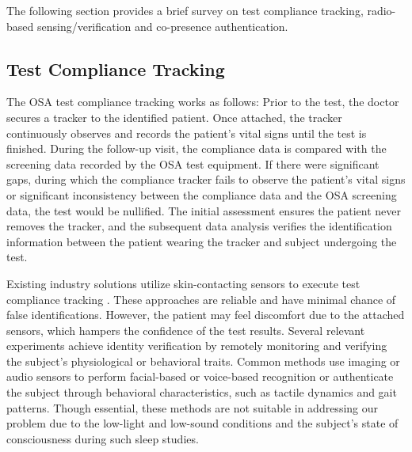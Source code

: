 The following section provides a brief survey on test compliance tracking, radio-based sensing/verification and co-presence authentication.

\subsection{Test Compliance Tracking}

The OSA test compliance tracking works as follows: Prior to the test, the doctor secures a tracker to the identified patient. Once attached, the tracker continuously observes and records the patient's vital signs until the test is finished. During the follow-up visit, the compliance data is compared with the screening data recorded by the OSA test equipment. If there were significant gaps, during which the compliance tracker fails to observe the patient's vital signs or significant inconsistency between the compliance data and the OSA screening data, the test would be nullified. The initial assessment ensures the patient never removes the tracker, and the subsequent data analysis verifies the identification information between the patient wearing the tracker and subject undergoing the test. 

Existing industry solutions utilize skin-contacting sensors to execute test compliance tracking \cite{noauthor_httpspatentsgooglecompatentus8679012b1en_nodate, noauthor_httpwwwsleepreviewmagcom201806tech-fraudulent-sleep-data_nodate}. These approaches are reliable and have minimal chance of false identifications. However, the patient may feel discomfort due to the attached sensors, which hampers the confidence of the test results. Several relevant experiments achieve identity verification by remotely monitoring and verifying the subject's physiological or behavioral traits. Common methods use imaging or audio sensors to perform facial-based or voice-based recognition \cite{hutchison_robust_2005, li_sound-based_2010,abushariah_voice_2012} or  authenticate the subject through behavioral characteristics, such as tactile dynamics and gait patterns\cite{collins_silhouette-based_2002,connor_biometric_2018}. Though essential, these methods are not suitable in addressing our problem due to the low-light and low-sound conditions and the subject's state of consciousness during such sleep studies.

